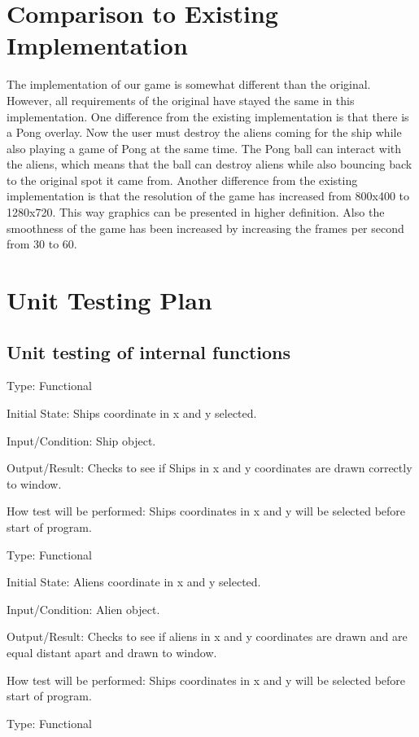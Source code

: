 \documentclass[12pt, titlepage]{article}
\begin{document}
\section{Comparison to Existing Implementation}	
The implementation of our game is somewhat different than the original. However, all requirements of the original have stayed the same in this implementation. 
One difference from the existing implementation is that there is a Pong overlay. Now the user must destroy the aliens coming for the ship while also playing a 
game of Pong at the same time. The Pong ball can interact with the aliens, which means that the ball can destroy aliens while also bouncing back to the original 
spot it came from. Another difference from the existing implementation is that the resolution of the game has increased from 800x400 to 1280x720. 
This way graphics can be presented in higher definition. Also the smoothness of the game has been increased by increasing the frames per second from 30 to 60.
				
\section{Unit Testing Plan}
		
\subsection{Unit testing of internal functions}

Type: Functional

Initial State: Ships coordinate in x and y selected.

Input/Condition: Ship object.

Output/Result: Checks to see if Ships in x and y coordinates are drawn correctly to window.

How test will be performed: Ships coordinates in x and y will be selected before start of program.

Type: Functional


Initial State: Aliens coordinate in x and y selected.

Input/Condition: Alien object.

Output/Result: Checks to see if aliens in x and y coordinates are drawn and are equal distant apart and drawn to window.

How test will be performed: Ships coordinates in x and y will be selected before start of program.


Type: Functional
\end{document}
